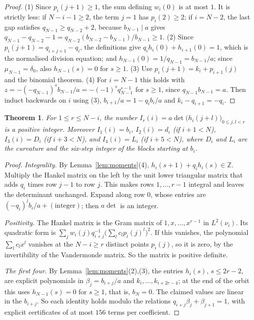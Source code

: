 \documentclass[11pt]{amsart}
\newtheorem{theorem}{Theorem}[section]
\theoremstyle{definition}
\theoremstyle{remark}
\begin{document}
\begin{proof}
(1) Since $p_i(j+1)\ge1$, the sum defining $w_i(0)$ is at most $1$. It is strictly less: if
$N-i-1\ge2$, the term $j=1$ has $p_i(2)\ge2$; if $i=N-2$, the last gap satisfies
$q_{N-1}\ge q_{N-2}+2$, because $b_{N-1}\mid a$ gives
$q_{N-1}-q_{N-2}-1=q_{N-2}(b_{N-2}-b_{N-1})/b_{N-1}\ge1$. (2) Since $p_i(j+1)=q_{i+j+1}-q_i$, the definitions give
$q_ih_i(0)+h_{i+1}(0)=1$, which is the normalised division equation; and
$h_{N-1}(0)=1/q_{N-1}=b_{N-1}/a$; since $\mu_{N-1}=\delta_0$, also $h_{N-1}(s)=0$ for $s\ge1$.
(3) Use $p_i(j+1)=k_i+p_{i+1}(j)$ and the binomial theorem.
(4) For $i=N-1$ this holds with $z=-(-q_{N-1})^sb_{N-1}/a=-(-1)^sq_{N-1}^{s-1}$ for $s\ge1$, since
$q_{N-1}b_{N-1}=a$. Then induct backwards on $i$ using (3), $b_{i+1}/a=1-q_ib_i/a$ and
$k_i-q_{i+1}=-q_i$.
\end{proof}

\begin{theorem}\label{thm:hankel}
For $1\le r\le N-i$, the number $I_r(i)=a\det\bigl(h_i(j+l)\bigr)_{0\le j,l<r}$ is a positive
integer. Moreover $I_1(i)=b_i$, $I_2(i)=d_i$ (if $i+1<N$), $I_3(i)=D_i$ (if $i+3<N$), and
$I_4(i)=L_i$ (if $i+5<N$), where $D_i$ and $L_i$ are the curvature and the six-step integer
of the blocks starting at $b_i$.
\end{theorem}

\begin{proof}
\emph{Integrality.} By Lemma~\ref{lem:moments}(4),
$h_i(s+1)+q_ih_i(s)\in\mathbb Z$. Multiply the Hankel matrix on the left by the unit lower
triangular matrix that adds $q_i$ times row $j-1$ to row $j$. This makes rows
$1,\dots,r-1$ integral and leaves the determinant unchanged. Expand along row $0$, whose entries
are $(-q_i)^lb_i/a+(\text{integer})$; then $a\det$ is an integer.

\emph{Positivity.} The Hankel matrix is the Gram matrix of $1,x,\dots,x^{r-1}$ in $L^2(\nu_i)$.
Its quadratic form is $\sum_jw_i(j)q_{i+j}^{-1}\bigl(\sum_lc_lp_i(j)^l\bigr)^2$. If this
vanishes, the polynomial $\sum_lc_lx^l$ vanishes at the $N-i\ge r$ distinct points $p_i(j)$, so
it is zero, by the invertibility of the Vandermonde matrix. So the matrix is positive definite.

\emph{The first four.} By Lemma~\ref{lem:moments}(2),(3), the entries $h_i(s)$, $s\le2r-2$, are
explicit polynomials in $\beta_j=b_{i+j}/a$ and $k_i,\dots,k_{i+2r-4}$; at the end of the orbit
this uses $h_{N-1}(s)=0$ for $s\ge1$, that is, $b_N=0$. The claimed values are
linear in the $b_{i+j}$. So each identity holds modulo the relations
$q_{i+j}\beta_j+\beta_{j+1}=1$, with explicit certificates of at most $156$ terms per
coefficient.
\end{proof}
\end{document}
